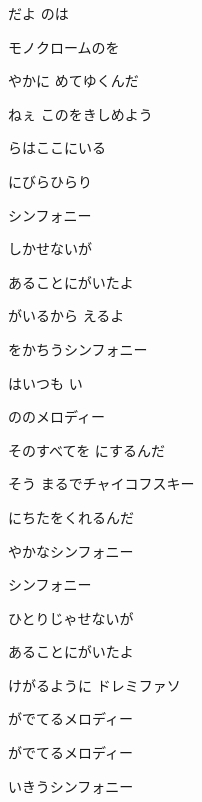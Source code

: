 \documentclass[14pt]{ltjsarticle}
\begin{document}
{\item
  だよ のは
  \jisho{}


モノクロームのを
  \jisho{}

  やかに めてゆくんだ
  \jisho{}


ねぇ このをきしめよう
  \jisho{}

  らはここにいる
  \jisho{}

\item
  にびらひらり
  \jisho{}

  シンフォニー
  \jisho{}

  しかせないが
  \jisho{}


あることにがいたよ
  \jisho{}

  がいるから えるよ
  \jisho{}

  をかちうシンフォニー
  \jisho{}

\item
  はいつも い
  \jisho{}

  ののメロディー
  \jisho{}


そのすべてを にするんだ
  \jisho{}


そう まるでチャイコフスキー
  \jisho{}

  にちたをくれるんだ
  \jisho{}

\item
  やかなシンフォニー
  \jisho{}

  シンフォニー
  \jisho{}


ひとりじゃせないが
  \jisho{}


あることにがいたよ
  \jisho{}

  けがるように ドレミファソ
  \jisho{}

  がでてるメロディー
  \jisho{}

  がでてるメロディー
  \jisho{}

  いきうシンフォニー
  \jisho{}


}
\end{document}
